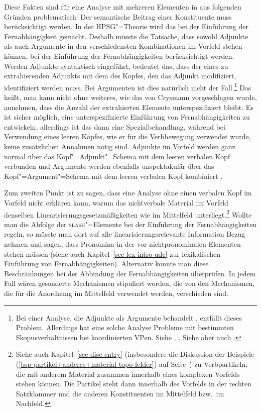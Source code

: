 Diese Fakten sind für eine Analyse mit mehreren Elementen in \slasch aus folgenden Gründen problematisch:
Der semantische Beitrag einer Konstituente muss berücksichtigt werden. In der HPSG"=Theorie
wird das bei der Einführung der Fernabhängigkeit gemacht. Deshalb müsste die Tatsache, dass
sowohl Adjunkte als auch Argumente in den verschiedensten Kombinationen im Vorfeld stehen
können, bei der Einführung der Fernabhängigkeiten berücksichtigt werden. Werden Adjunkte
syntaktisch eingeführt, bedeutet das, dass der \modw eines zu extrahierenden Adjunkts mit dem
\synsemw des Kopfes, den das Adjunkt modifiziert, identifiziert werden muss. Bei Argumenten
ist dies natürlich nicht der Fall.\footnote{
  Bei einer Analyse, die Adjunkte als Argumente behandelt \citep*{BMS2001a}, entfällt dieses Problem. Allerdings hat
  eine solche Analyse Probleme mit bestimmten Skopusverhältnissen bei koordinierten VPen.
  Siehe , . Siehe aber auch .%
}
Das heißt, man kann nicht ohne weiteres, wie das von
Crysmann vorgeschlagen wurde, annehmen, dass die Anzahl der extrahierten Elemente unterspezifiziert
bleibt. Es ist sicher möglich, eine unterspezifizierte Einführung von Fernabhängigkeiten
zu entwickeln, allerdings ist das dann eine Spezialbehandlung, während bei Verwendung
eines leeren Kopfes, wie er für die Verbbewegung verwendet wurde, keine zusätzlichen Annahmen
nötig sind. Adjunkte im Vorfeld werden ganz normal über das Kopf"=Adjunkt"=Schema mit dem leeren
verbalen Kopf verbunden und Argumente werden ebenfalls unspektakulär über das Kopf"=Argument"=Schema
mit dem leeren verbalen Kopf kombiniert \citep[Abschnitt~4]{Mueller2005d}.

Zum zweiten Punkt ist zu sagen, dass eine Analyse ohne einen verbalen Kopf im Vorfeld nicht erklären
kann, warum das nichtverbale Material im Vorfeld denselben Linearisierungsgesetzmäßigkeiten 
wie im Mittelfeld unterliegt.\footnote{
  Siehe auch Kapitel~\ref{sec-disc-entry} (insbesondere die Diskussion der Beispiele (\ref{bsp-partikel+anderes+material-topo-felder})
  auf Seite~\pageref{bsp-partikel+anderes+material-topo-felder}) zu Verbpartikeln, die mit anderem Material zusammen
  innerhalb eines komplexen Vorfelds stehen können. Die Partikel steht dann innerhalb des Vorfelds in der rechten Satzklammer
  und die anderen Konstituenten im Mittelfeld bzw.\ im Nachfeld.%
} Wollte man die Abfolge der \textsc{slash}"=Elemente bei der Einführung der Fernabhängigkeiten
regeln, so müsste man dort auf alle linearisierungsrelevante Information Bezug nehmen und \zb
sagen, dass Pronomina in der \slashl vor nichtpronominalen Elementen stehen müssen (siehe auch Kapitel~\ref{sec-lex-intro-udc}
zur lexikalischen Einführung von Fernabhängigkeiten). Alternativ
könnte man diese Beschränkungen bei der Abbindung der Fernabhängigkeiten überprüfen. In jedem Fall
wären gesonderte Mechanismen stipuliert worden, die von den Mechanismen, die für die Anordnung
im Mittelfeld verwendet werden, verschieden sind.

